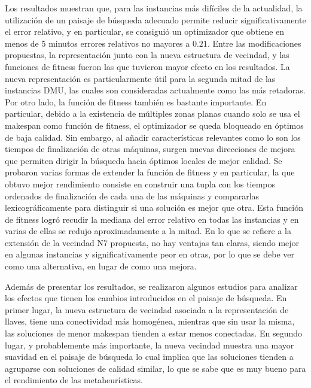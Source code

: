 Los resultados muestran que, para las instancias más difíciles de la actualidad, la utilización de un paisaje de búsqueda adecuado permite reducir
significativamente el error relativo, y en particular, se consiguió un optimizador que obtiene en menos de 5 minutos errores relativos no mayores a $0.21$.
%
Entre las modificaciones propuestas, la representación junto con la nueva estructura de vecindad, y las funciones de fitness fueron las que tuvieron mayor
efecto en los resultados.
%
La nueva representación es particularmente útil para la segunda mitad de las instancias DMU, las cuales son consideradas actualmente como las más retadoras.
%
Por otro lado, la función de fitness también es bastante importante.
%
En particular, debido a la existencia de múltiples zonas planas cuando solo se usa el makespan como función de fitness, el optimizador se queda bloqueado 
en óptimos de baja calidad. 
%
Sin embargo, al añadir características relevantes como lo son los tiempos de finalización de otras máquinas, surgen nuevas direcciones de mejora que permiten 
dirigir la búsqueda hacia óptimos locales de mejor calidad. 
%
Se probaron varias formas de extender la función de fitness y en particular, la que obtuvo mejor rendimiento consiste en construir una tupla con los tiempos 
ordenados de finalización de cada una de las máquinas y compararlas lexicográficamente para distinguir si una solución es mejor que otra. 
%
Esta función de fitness logró recudir la mediana del error relativo en todas las instancias y en varias de ellas se redujo aproximadamente a la mitad.
%
En lo que se refiere a la extensión de la vecindad N7 propuesta, no hay ventajas tan claras, siendo mejor en algunas instancias y significativamente peor en otras, por 
lo que se debe ver como una alternativa, en lugar de como una mejora.

Además de presentar los resultados, se realizaron algunos estudios para analizar los efectos que tienen los cambios introducidos en el paisaje de búsqueda.
%
En primer lugar, la nueva estructura de vecindad asociada a la representación de llaves, tiene una conectividad más homogénea, mientras que sin usar la misma,
las soluciones de menor makespan tienden a estar menos conectadas.
%
En segundo lugar, y probablemente más importante, la nueva vecindad muestra una mayor suavidad en el paisaje de búsqueda lo cual implica que las soluciones tienden 
a agruparse con soluciones de calidad similar, lo que se sabe que es muy bueno para el rendimiento de las metaheurísticas.
%

